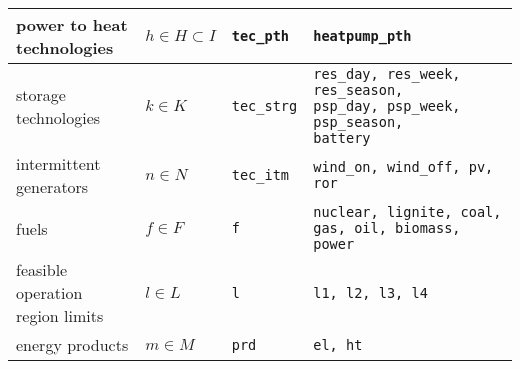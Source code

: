 \documentclass[11pt,a4paper]{article}
\begin{document}
\begin{tabular}{l l l l}
\makecell[l]{power to heat \\ technologies} & $h \in H \subset I$ & \texttt{tec\_pth} & \texttt{heatpump\_pth}  \\ \hline

\makecell[l]{storage \\technologies} & $k \in K$ & \texttt{tec\_strg} & \makecell[l]{
	\texttt{res\_day, res\_week, res\_season,} \\ 
	\texttt{psp\_day, psp\_week, psp\_season,} \\
	\texttt{battery}
	} \\ \hline

\makecell[l]{intermittent \\generators} & $n \in N$ & \texttt{tec\_itm} & \texttt{wind\_on, wind\_off, pv, ror}\\ \hline

fuels & $f \in F$ & \texttt{f} & \makecell[l]{\texttt{nuclear, lignite, coal,} \\ \texttt{gas, oil, biomass, power}} \\ \hline

\makecell[l]{feasible operation \\region limits}& $l \in L$ & \texttt{l} & \texttt{l1, l2, l3, l4} \\ \hline

energy products & $m \in M$ & \texttt{prd} & \texttt{el, ht} \\ \hline \hline
\end{tabular}
\end{document}

